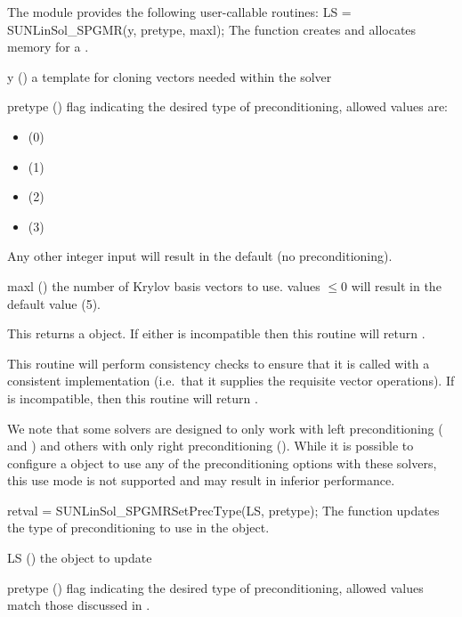 The module {\sunlinsolspgmr} provides the following user-callable routines: 
{
  LS = SUNLinSol\_SPGMR(y, pretype, maxl);
}
{
  The function  creates and allocates memory for
  a {\spgmr} .
}
{
  \begin{args}[pretype]
  \item[y] ()
    a template for cloning vectors needed within the solver
  \item[pretype] ()
    flag indicating the desired type of preconditioning, allowed
    values are:
    \begin{itemize}
    \item {} (0)
    \item {} (1)
    \item {} (2)
    \item {} (3)
    \end{itemize}
    Any other integer input will result in the default (no
    preconditioning).
  \item[maxl] ()
    the number of Krylov basis vectors to use.  values $\le0$ will
    result in the default value (5).
  \end{args}
}
{
  This returns a  object.  If either  is
  incompatible then this routine will return . 
}
{
  This routine will perform consistency checks to ensure that it is
  called with a consistent {\nvector} implementation (i.e.~that it
  supplies the requisite vector operations).  If  is
  incompatible, then this routine will return .
  
  We note that some {\sundials} solvers are designed to only work
  with left preconditioning ({\ida} and {\idas}) and others with only
  right preconditioning ({\kinsol}). While it is possible to configure
  a {\sunlinsolspgmr} object to use any of the preconditioning options
  with these solvers, this use mode is not supported and may result in
  inferior performance.
}
{
  retval = SUNLinSol\_SPGMRSetPrecType(LS, pretype);
}
{
  The function  updates the type of
  preconditioning to use in the {\sunlinsolspgmr} object.
}
{
  \begin{args}[pretype]
  \item[LS] ()
    the {\sunlinsolspgmr} object to update
  \item[pretype] ()
    flag indicating the desired type of preconditioning, allowed
    values match those discussed in .
  \end{args}
}
